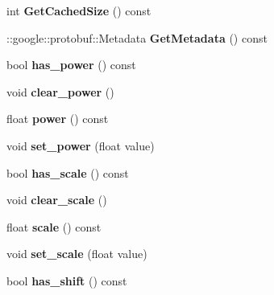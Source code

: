 \begin{DoxyCompactItemize}
int {\bfseries Get\+Cached\+Size} () const
\item 
\mbox{\label{classcaffe_1_1_power_parameter_aad9b72dff75b924cf92a2b9cb032c4bc}} 
\+::google\+::protobuf\+::\+Metadata {\bfseries Get\+Metadata} () const
\item 
\mbox{\label{classcaffe_1_1_power_parameter_ab1168306c6311cd0b400491a5132586d}} 
bool {\bfseries has\+\_\+power} () const
\item 
\mbox{\label{classcaffe_1_1_power_parameter_a8e45cde2aecb17f30ddfade6865a2f70}} 
void {\bfseries clear\+\_\+power} ()
\item 
\mbox{\label{classcaffe_1_1_power_parameter_acd7ebf1cd66fd4fac60009b8528bd1be}} 
float {\bfseries power} () const
\item 
\mbox{\label{classcaffe_1_1_power_parameter_a5054711db03eace626c4a338c7327ac5}} 
void {\bfseries set\+\_\+power} (float value)
\item 
\mbox{\label{classcaffe_1_1_power_parameter_ad8a91ea77f39bd0c3c2849bcd42a782a}} 
bool {\bfseries has\+\_\+scale} () const
\item 
\mbox{\label{classcaffe_1_1_power_parameter_aad34de253733a9b6388f9ec3f0e934ba}} 
void {\bfseries clear\+\_\+scale} ()
\item 
\mbox{\label{classcaffe_1_1_power_parameter_a752367b74de966823c959f8f1a338580}} 
float {\bfseries scale} () const
\item 
\mbox{\label{classcaffe_1_1_power_parameter_a0b7f2ad02f05f03d0cbf6fa711219732}} 
void {\bfseries set\+\_\+scale} (float value)
\item 
\mbox{\label{classcaffe_1_1_power_parameter_a9104f46440421dc73f662b1fe689b33a}} 
bool {\bfseries has\+\_\+shift} () const
\item 
\mbox{\label{classcaffe_1_1_power_parameter_a17780b184ddea16906679a27b0d3f95b}} 

\end{DoxyCompactItemize}

